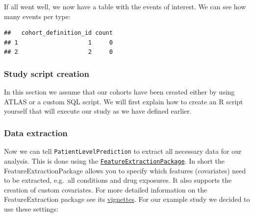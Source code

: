 \documentclass[
]{article}
\newenvironment{Shaded}{\begin{snugshade}}{\end{snugshade}}
\newcommand{\DataTypeTok}[1]{\textcolor[rgb]{0.13,0.29,0.53}{#1}}
\newcommand{\KeywordTok}[1]{\textcolor[rgb]{0.13,0.29,0.53}{\textbf{#1}}}
\newcommand{\NormalTok}[1]{#1}
\newcommand{\OperatorTok}[1]{\textcolor[rgb]{0.81,0.36,0.00}{\textbf{#1}}}
\newcommand{\StringTok}[1]{\textcolor[rgb]{0.31,0.60,0.02}{#1}}
\begin{document}
If all went well, we now have a table with the events of interest. We
can see how many events per type:

\begin{Shaded}
\end{Shaded}

\begin{verbatim}
##   cohort_definition_id count
## 1                    1     0
## 2                    2     0
\end{verbatim}

\hypertarget{study-script-creation-1}{%
\subsubsection{Study script creation}\label{study-script-creation-1}}

In this section we assume that our cohorts have been created either by
using ATLAS or a custom SQL script. We will first explain how to create
an R script yourself that will execute our study as we have defined
earlier.

\hypertarget{data-extraction-1}{%
\subsubsection{Data extraction}\label{data-extraction-1}}

Now we can tell \texttt{PatientLevelPrediction} to extract all necessary
data for our analysis. This is done using the
\href{https://github.com/OHDSI/FeatureExtration}{\texttt{FeatureExtractionPackage}}.
In short the FeatureExtractionPackage allows you to specify which
features (covariates) need to be extracted, e.g.~all conditions and drug
exposures. It also supports the creation of custom covariates. For more
detailed information on the FeatureExtraction package see its
\href{https://github.com/OHDSI/FeatureExtration}{vignettes}. For our
example study we decided to use these settings:
\end{document}
